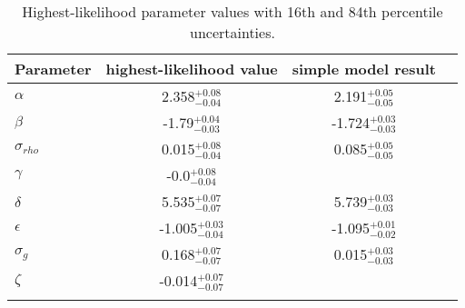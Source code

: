 \begin{table}
\caption{Highest-likelihood parameter values with 16th and 84th
	percentile uncertainties.}
\begin{tabular}{lccc}
\hline\hline
Parameter & highest-likelihood value & simple model result \\
    \hline
$\alpha$ &    2.358$_{-0.04}^{+0.08}$ &       2.191$_{-0.05}^{+0.05}$  \\
$\beta$ &    -1.79$_{-0.03}^{+0.04}$ &        -1.724$_{-0.03}^{+0.03}$ \\
$\sigma_{rho}$ &    0.015$_{-0.04}^{+0.08}$ &   0.085$_{-0.05}^{+0.05}$  \\
$\gamma$ &    -0.0$_{-0.04}^{+0.08}$ & \\
$\delta$ &    5.535$_{-0.07}^{+0.07}$ &      5.739$_{-0.03}^{+0.03}$  \\
$\epsilon$ &    -1.005$_{-0.04}^{+0.03}$ &   -1.095$_{-0.02}^{+0.01}$ \\
$\sigma_g$ &    0.168$_{-0.07}^{+0.07}$ &    0.015$_{-0.03}^{+0.03}$  \\
$\zeta$ &    -0.014$_{-0.07}^{+0.07}$ & \\
    \hline
\label{tab:results}
\end{tabular}
\end{table}
